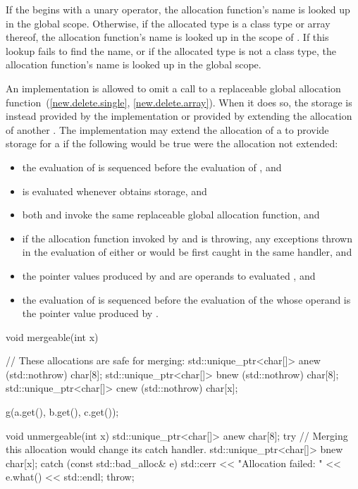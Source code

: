 \pnum
{}%
If the  begins with a unary \tcode{::}
operator, the allocation function's name is looked up in the global
scope. Otherwise, if the allocated type is a class type  or
array thereof, the allocation function's name is looked up in the scope
of . If this lookup fails to find the name, or if the allocated
type is not a class type, the allocation function's name is looked up in
the global scope.

\pnum
An implementation is allowed to omit a call to a replaceable global allocation
function~(\ref{new.delete.single}, \ref{new.delete.array}). When it does so,
the storage is instead provided by the implementation or provided by extending
the allocation of another . The implementation may
extend the allocation of a   to provide
storage for a   if the
following would be true were the allocation not extended:

\begin{itemize}
\item the evaluation of  is sequenced before the evaluation of
, and

\item {} is evaluated whenever  obtains storage, and

\item both  and  invoke the same replaceable global
allocation function, and

\item if the allocation function invoked by  and  is
throwing, any exceptions thrown in the evaluation of either  or
 would be first caught in the same handler, and

\item the pointer values produced by  and  are operands to
evaluated , and

\item the evaluation of  is sequenced before the evaluation of the
 whose operand is the pointer value produced
by .
\end{itemize}

\begin{example}
\begin{codeblock}
  void mergeable(int x) {
    // These allocations are safe for merging:
    std::unique_ptr<char[]> a{new (std::nothrow) char[8]};
    std::unique_ptr<char[]> b{new (std::nothrow) char[8]};
    std::unique_ptr<char[]> c{new (std::nothrow) char[x]};

    g(a.get(), b.get(), c.get());
  }

  void unmergeable(int x) {
    std::unique_ptr<char[]> a{new char[8]};
    try {
      // Merging this allocation would change its catch handler.
      std::unique_ptr<char[]> b{new char[x]};
    } catch (const std::bad_alloc& e) {
      std::cerr << "Allocation failed: " << e.what() << std::endl;
      throw;
    }
  }
\end{codeblock}
\end{example}


